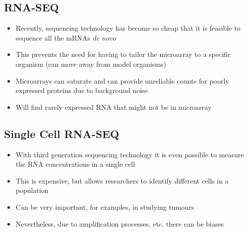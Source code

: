
\begin{slide}
\section{RNA-SEQ}

\begin{PauseHighLight}
  \begin{itemize}
  \item Recently, sequencing technology has become so cheap that it is
    feasible to sequence all the mRNAs \textit{de novo}\pause
  \item This prevents the need for having to tailor the microarray to a
    specific organism (can move away from model organisms)\pause
  \item Microarrays can saturate and can provide unreliable counts for
    poorly expressed proteins due to background noise\pause
  \item Will find rarely expressed RNA that might not be in
    microarray\pause
  \end{itemize}
\end{PauseHighLight}

\end{slide}


\begin{slide}
\section{Single Cell RNA-SEQ}

\begin{PauseHighLight}
  \begin{itemize}
  \item With third generation sequencing technology it is even possible
    to measure the RNA concentrations in a single cell\pause
  \item This is expensive, but allows researchers to identify different
    cells in a population\pause
  \item Can be very important, for examples, in studying tumours\pause
  \item Nevertheless, due to amplification processes, etc.{} there can be
    biases\pause
  \end{itemize}
\end{PauseHighLight}

\end{slide}

